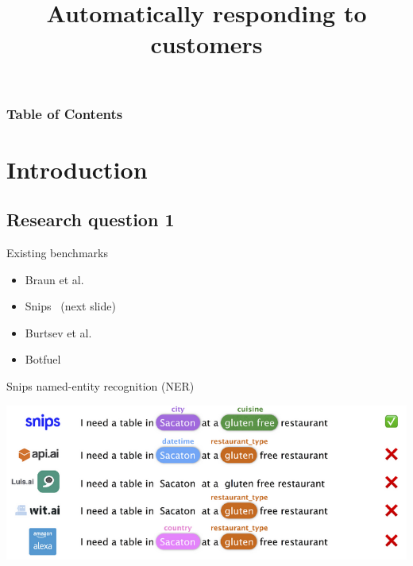 \documentclass[pdf]{beamer}
\title{Automatically responding to customers}
\begin{document}
    \begin{frame}
        \titlepage
    \end{frame}

    \begin{frame}
        \frametitle{Table of Contents}
        \tableofcontents[hideothersubsections]
    \end{frame}

    \section{Introduction}
    \subsection{Research question 1}
    \begin{frame}{Existing benchmarks}
        \begin{itemize}
            \item Braun et al.~\cite{braun2017}
            \item Snips~\cite{snips2017benchmarking} (next slide)
            \item Burtsev et al.~\cite{burtsev2018}
            \item Botfuel~\cite{botfuel2018benchmark}
        \end{itemize}
    \end{frame}

    \begin{frame}{Snips named-entity recognition (NER)}
        \begin{center}
            \includegraphics[width=\textwidth]{figures/snips_ner.png}
        \end{center}
    \end{frame}
\end{document}
